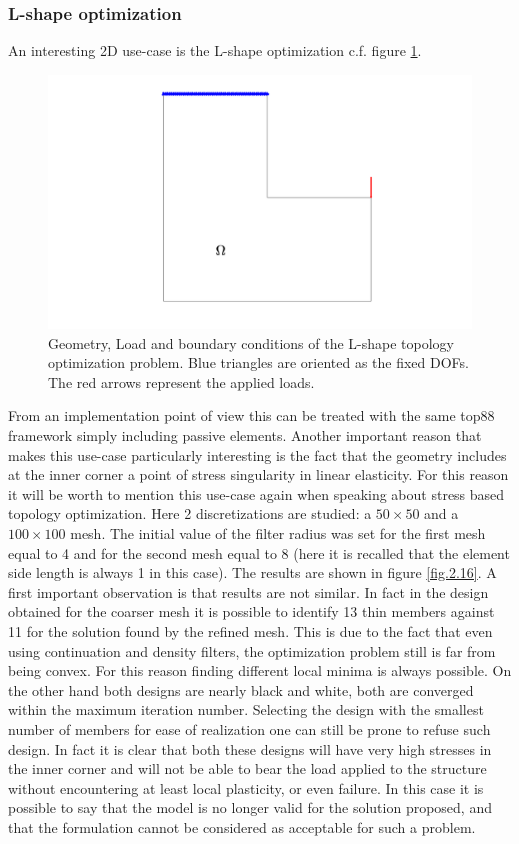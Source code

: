 \subsubsection{L-shape optimization}
An interesting 2D use-case is the L-shape optimization c.f. figure \ref{fig.2.15}. 
\begin{figure}[ht]
\centering
\includegraphics[width=\textwidth]{images/Ch2/design_problem3}
\caption{Geometry, Load and boundary conditions of the L-shape topology optimization problem. Blue triangles are oriented as the fixed DOFs. The red arrows represent the applied loads.}
\label{fig.2.15}
\end{figure}
From an implementation point of view this can be treated with the same top88 framework simply including passive elements. Another important reason that makes this use-case particularly interesting is the fact that the geometry includes at the inner corner a point of stress singularity  in linear elasticity. For this reason it will be worth to mention this use-case again when speaking about stress based topology optimization. Here 2 discretizations are studied: a $50\times50$ and a $100\times100$ mesh.
The initial value of the filter radius was set for the first mesh equal to 4 and for the second mesh equal to 8 (here it is recalled that the element side length is always 1 in this case). The results are shown in figure \ref{fig.2.16}. A first important observation is that results are not similar. In fact in the design obtained for the coarser mesh it is possible to identify 13 thin members against 11 for the solution found by the refined mesh. This is due to the fact that even using continuation and density filters, the optimization problem still is far from being convex. For this reason finding different local minima is always possible. On the other hand both designs are nearly black and white, both are converged within the maximum iteration number. Selecting the design with the smallest number of members for ease of realization one can still be prone to refuse such design. In fact it is clear that both these designs will have very high stresses in the inner corner and will not be able to bear the load applied to the structure without encountering at least local plasticity, or even failure. In this case it is possible to say that the model is no longer valid for the solution proposed, and that the formulation cannot be considered as acceptable for such a problem. 
